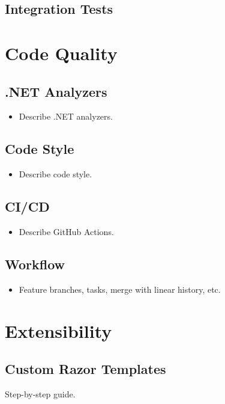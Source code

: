 \subsection{Integration Tests}

\section{Code Quality}

\subsection{.NET Analyzers}
\begin{itemize}
    \item Describe .NET analyzers.
\end{itemize}

\subsection{Code Style}
\begin{itemize}
    \item Describe code style.
\end{itemize}

\subsection{CI/CD}
\begin{itemize}
    \item Describe GitHub Actions.
\end{itemize}

\subsection{Workflow}
\begin{itemize}
    \item Feature branches, tasks, merge with linear history, etc.
\end{itemize}

\section{Extensibility}

\subsection{Custom Razor Templates}
Step-by-step guide.

